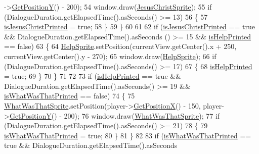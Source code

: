 \begin{DoxyCode}
      ->\hyperlink{classPlayerObject_ad17b9ec44299f4dc9ca20064c883496b}{GetPositionY}() - 200);
54             window.draw(\hyperlink{classDialogue_a878b13ffe10617ab228e8630c53dcdca}{JesusChristSprite});
55             \textcolor{keywordflow}{if} (DialogueDuration.getElapsedTime().asSeconds() >= 13)
56             \{
57                 \hyperlink{classDialogue_a54544b789f4b8a06542f20c37ce6b2e0}{isJesusChristPrinted} = \textcolor{keyword}{true};
58             \}
59         \}
60 
61 
62         \textcolor{keywordflow}{if} (\hyperlink{classDialogue_a54544b789f4b8a06542f20c37ce6b2e0}{isJesusChristPrinted} == \textcolor{keyword}{true} && DialogueDuration.getElapsedTime().asSeconds
      () >= 15 && \hyperlink{classDialogue_a852fcfebbb5f7aac29ce4338205f3b0f}{isHelpPrinted} == \textcolor{keyword}{false})
63         \{
64             \hyperlink{classDialogue_a6d1fb2d167d8efe017e3a5aac0ffcdc6}{HelpSprite}.setPosition(currentView.getCenter().x + 250, currentView.getCenter().y - 
      270);
65             window.draw(\hyperlink{classDialogue_a6d1fb2d167d8efe017e3a5aac0ffcdc6}{HelpSprite});
66             \textcolor{keywordflow}{if} (DialogueDuration.getElapsedTime().asSeconds() >= 17)
67             \{
68                 \hyperlink{classDialogue_a852fcfebbb5f7aac29ce4338205f3b0f}{isHelpPrinted} = \textcolor{keyword}{true};
69             \}
70         \}
71 
72 
73         \textcolor{keywordflow}{if} (\hyperlink{classDialogue_a852fcfebbb5f7aac29ce4338205f3b0f}{isHelpPrinted} == \textcolor{keyword}{true} && DialogueDuration.getElapsedTime().asSeconds() >= 19 && 
      \hyperlink{classDialogue_aa11d331eac3633cfee6e580fb838e9ef}{isWhatWasThatPrinted} == \textcolor{keyword}{false})
74         \{
75              \hyperlink{classDialogue_af40f2d0d2dfded21a8a5a5b62d347fb7}{WhatWasThatSprite}.setPosition(player->\hyperlink{classPlayerObject_aa84a7779304b680fa32b88b01ba95d02}{GetPositionX}() - 150, 
      player->\hyperlink{classPlayerObject_ad17b9ec44299f4dc9ca20064c883496b}{GetPositionY}() - 200);
76              window.draw(\hyperlink{classDialogue_af40f2d0d2dfded21a8a5a5b62d347fb7}{WhatWasThatSprite});
77              \textcolor{keywordflow}{if} (DialogueDuration.getElapsedTime().asSeconds() >= 21)
78              \{
79                 \hyperlink{classDialogue_aa11d331eac3633cfee6e580fb838e9ef}{isWhatWasThatPrinted} = \textcolor{keyword}{true};
80              \}
81         \}
82 
83         \textcolor{keywordflow}{if} (\hyperlink{classDialogue_aa11d331eac3633cfee6e580fb838e9ef}{isWhatWasThatPrinted} == \textcolor{keyword}{true} && DialogueDuration.getElapsedTime().asSeconds

\end{DoxyCode}
